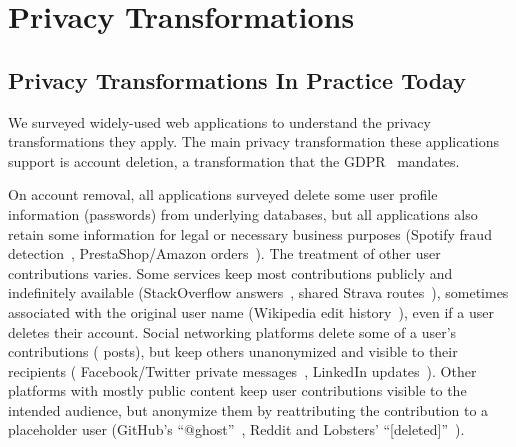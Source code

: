 \section{Privacy Transformations}
\label{sec:survey}

\subsection{Privacy Transformations In Practice Today}
%
We surveyed widely-used web applications to understand the privacy
transformations they apply.
%
The main privacy transformation these applications support is account deletion,
a transformation that \eg the GDPR~\cite[Art.\ 17]{eu:gdpr} mandates.
%


%
On account removal, all applications surveyed delete some user profile
information (\eg passwords) from underlying databases, but all applications
also retain some information for legal or necessary business purposes
(\eg Spotify fraud detection~\cite{spotify:privacy}, PrestaShop/Amazon
orders~\cite{amazon:privacy, prestashop:privacy}).
%
The treatment of other user contributions varies.
%
Some services keep most contributions publicly and indefinitely available (\eg StackOverflow
answers~\cite{stackoverflow:privacy}, shared Strava routes~\cite{strava:privacy}), sometimes
associated with the original user name (\eg Wikipedia edit history~\cite{wikipedia:privacy}), even
if a user deletes their account.
%
Social networking platforms delete some of a user's contributions (\eg
posts), but keep others unanonymized and visible to their recipients (\eg
Facebook/Twitter private messages~\cite{facebook:privacy, twitter:privacy},
LinkedIn updates~\cite{linkedin:privacy}).
%
Other platforms with mostly public content keep user contributions visible to the intended
audience, but anonymize them by reattributing the contribution to a placeholder user
(\eg GitHub's ``@ghost''~\cite{github:privacy}, Reddit and Lobsters'
``[deleted]''~\cite{reddit:privacy, lobsters:privacy}).
%
%

